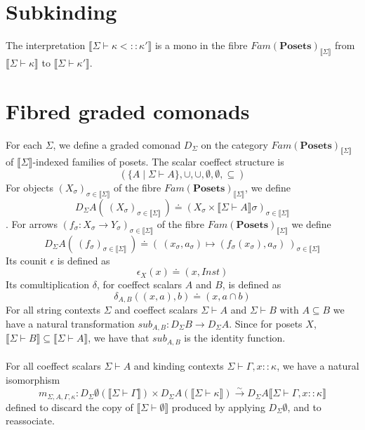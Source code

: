 \documentclass{article}
\newcommand{\mbf}{\mathbf}
\newcommand{\sem}[1]{\llbracket #1 \rrbracket}
\begin{document}
\section*{Subkinding}

The interpretation $\sem{\Sigma \vdash \kappa <:: \kappa'}$ is a mono in the fibre $\mathit{Fam}(\mbf{Posets})_{\sem{\Sigma}}$ from $\sem{\Sigma \vdash \kappa}$ to $\sem{\Sigma \vdash \kappa'}$.


\section*{Fibred graded comonads}

For each $\Sigma$, we define a graded comonad $D_{\Sigma}$ on the category $\mathit{Fam}(\mbf{Posets})_{\sem{\Sigma}}$ of
$\sem{\Sigma}$-indexed families of posets. The scalar coeffect structure is 
$$( \{ A \mid \Sigma \vdash A \}, \cup, \cup, \emptyset, \emptyset, \subseteq)$$
For objects $(X_\sigma)_{\sigma \in \sem{\Sigma}}$ of the fibre $\mathit{Fam}(\mbf{Posets})_{\sem{\Sigma}}$, we define $$D_{\Sigma} A(~(X_\sigma)_{\sigma \in \sem{\Sigma}}~) \doteq (X_\sigma \times \sem{\Sigma \vdash A}\sigma)_{\sigma \in \sem{\Sigma}}$$.
For arrows $(f_\sigma : X_\sigma \to Y_\sigma)_{\sigma \in \sem{\Sigma}}$ of the fibre $\mathit{Fam}(\mbf{Posets})_{\sem{\Sigma}}$ we define $$D_{\Sigma} A(~(f_\sigma)_{\sigma \in \sem{\Sigma}}~) \doteq (~(x_\sigma, a_\sigma) \mapsto (f_\sigma(x_\sigma),a_\sigma)~)_{\sigma \in \sem{\Sigma}}$$
Its counit $\epsilon$ is defined as $$\epsilon_X(x) \doteq (x,\mathit{Inst})$$
Its comultiplication $\delta$, for coeffect scalars $A$ and $B$, is defined as $$\delta_{A,B}((x,a),b) \doteq (x, a \cap b)$$
For all string contexts $\Sigma$ and coeffect scalars $\Sigma \vdash A$ and $\Sigma \vdash B$ with $A \subseteq B$ we have a natural transformation $\mathit{sub}_{A,B} : D_{\Sigma} B \to D_{\Sigma } A$. Since for posets $X$, $\sem{\Sigma \vdash B} \subseteq \sem{\Sigma \vdash A}$, we have that $\mathit{sub}_{A,B}$ is the identity function.\\~\\
For all coeffect scalars $\Sigma \vdash A$ and kinding contexts $\Sigma \vdash \Gamma,x :: \kappa$, we have a natural isomorphism $$m_{\Sigma,A,\Gamma,\kappa} : D_{\Sigma} \emptyset(\sem{\Sigma \vdash \Gamma}) \times D_{\Sigma} A( \sem{\Sigma \vdash \kappa} ) \overset{\sim}{\to} D_{\Sigma} A \sem{\Sigma \vdash \Gamma,x :: \kappa}$$ defined to discard the copy of $\sem{\Sigma \vdash \emptyset}$ produced by applying $D_{\Sigma} \emptyset$, and to reassociate.
\end{document}
